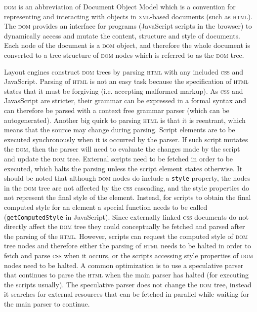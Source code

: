 \documentclass[a4paper,11pt]{kth-mag}
\newcommand{\code}[1]{\texttt{#1}}
\begin{document}
        \textsc{dom} is an abbreviation of Document Object Model which is a convention for representing and interacting with objects in \textsc{xml}-based documents (such as \textsc{html}).
        The \textsc{dom} provides an interface for programs (JavaScript scripts in the browser) to dynamically access and mutate the content, structure and style of documents.
        Each node of the document is a \textsc{dom} object, and therefore the whole document is converted to a tree structure of \textsc{dom} nodes which is referred to as the \textsc{dom} tree.

        Layout engines construct \textsc{dom} trees by parsing \textsc{html} with any included \textsc{css} and JavaScript.
        Parsing of \textsc{html} is not an easy task because the specification of \textsc{html} states that it must be forgiving (i.e. accepting malformed markup).
        As \textsc{css} and JavasScript are stricter, their grammar can be expressed in a formal syntax and can therefore be parsed with a context free grammar parser (which can be autogenerated).
        Another big quirk to parsing \textsc{html} is that it is reentrant, which means that the source may change during parsing.
        Script elements are to be executed synchronously when it is occurred by the parser.
        If such script mutates the \textsc{dom}, then the parser will need to evaluate the changes made by the script and update the \textsc{dom} tree.
        External scripts need to be fetched in order to be executed, which halts the parsing unless the script element states otherwise.
        It should be noted that although \textsc{dom} nodes do include a \code{style} property, the nodes in the \textsc{dom} tree are not affected by the \textsc{css} cascading, and the style properties do not represent the final style of the element.
        Instead, for scripts to obtain the final computed style for an element a special function needs to be called (\code{getComputedStyle} in JavaScript).
        Since externally linked \textsc{css} documents do not directly affect the \textsc{dom} tree they could conceptually be fetched and parsed after the parsing of the \textsc{html}.
        However, scripts can request the computed style of \textsc{dom} tree nodes and therefore either the parsing of \textsc{html} needs to be halted in order to fetch and parse \textsc{css} when it occurs, or the scripts accessing style properties of \textsc{dom} nodes need to be halted.
        A common optimization is to use a speculative parser that continues to parse the \textsc{html} when the main parser has halted (for executing the scripts usually).
        The speculative parser does not change the \textsc{dom} tree, instead it searches for external resources that can be fetched in parallel while waiting for the main parser to continue.
\end{document}

